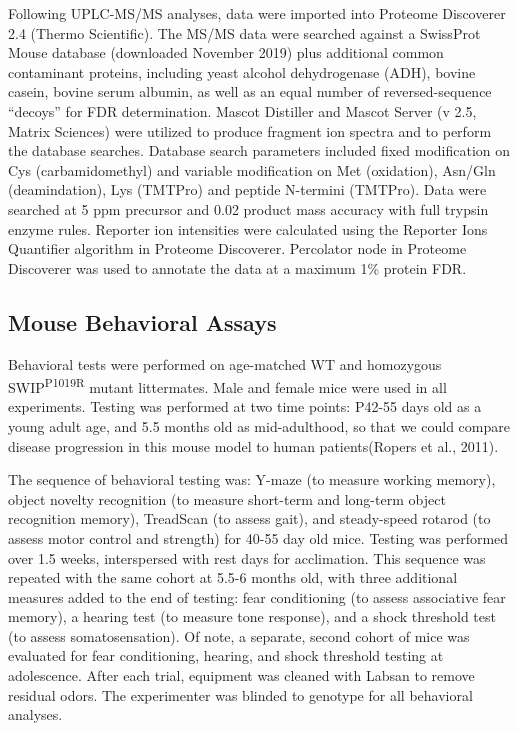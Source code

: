Following UPLC-MS/MS analyses, data were imported into Proteome Discoverer 2.4
(Thermo Scientific). The MS/MS data were searched against a SwissProt Mouse
database (downloaded November 2019) plus additional common contaminant proteins,
including yeast alcohol dehydrogenase (ADH), bovine casein, bovine serum
albumin, as well as an equal number of reversed-sequence “decoys” for FDR
determination. Mascot Distiller and Mascot Server (v 2.5, Matrix Sciences) were
utilized to produce fragment ion spectra and to perform the database searches.
Database search parameters included fixed modification on Cys (carbamidomethyl)
and variable modification on Met (oxidation), Asn/Gln (deamindation), Lys
(TMTPro) and peptide N-termini (TMTPro). Data were searched at 5 ppm precursor
and 0.02 product mass accuracy with full trypsin enzyme rules. Reporter ion
intensities were calculated using the Reporter Ions Quantifier algorithm in
Proteome Discoverer. Percolator node in Proteome Discoverer was used to annotate
the data at a maximum 1\% protein FDR.

\subsection{Mouse Behavioral Assays}

Behavioral tests were performed on age-matched WT and homozygous
SWIP\textsuperscript{P1019R} mutant littermates. Male and female mice were used
in all experiments. Testing was performed at two time points: P42-55 days old as
a young adult age, and 5.5 months old as mid-adulthood, so that we could compare
disease progression in this mouse model to human patients(Ropers et al., 2011).

The sequence of behavioral testing was: Y-maze (to measure working memory),
object novelty recognition (to measure short-term and long-term object
recognition memory), TreadScan (to assess gait), and steady-speed rotarod (to
assess motor control and strength) for 40-55 day old mice. Testing was performed
over 1.5 weeks, interspersed with rest days for acclimation. This sequence was
repeated with the same cohort at 5.5-6 months old, with three additional
measures added to the end of testing: fear conditioning (to assess associative
fear memory), a hearing test (to measure tone response), and a shock threshold
test (to assess somatosensation). Of note, a separate, second cohort of mice was
evaluated for fear conditioning, hearing, and shock threshold testing at
adolescence. After each trial, equipment was cleaned with Labsan to remove
residual odors. The experimenter was blinded to genotype for all behavioral
analyses.

